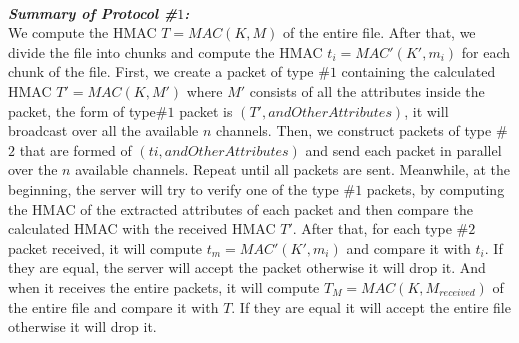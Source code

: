\documentclass[main.tex]{subfiles}
\begin{document}
\paragraph{}
\textbf{\textit{Summary of Protocol \#$1$:}}\\
We compute the HMAC $T = MAC(K,M)$ of the entire file. After that, we divide the file into chunks and compute the HMAC $t_i = MAC'(K',m_i)$ for each chunk of the file. First, we create a packet of type \#$1$ containing the calculated HMAC $T' = MAC(K,M')$ where $M'$ consists of all the attributes inside the packet, the form of type\#$1$ packet is $(T',andOtherAttributes)$, it will broadcast over all the available $n$ channels. Then, we construct packets of type \#$2$ that are formed of $(ti, andOtherAttributes)$ and send each packet in parallel over the $n$ available channels. Repeat until all packets are sent. Meanwhile, at the beginning, the server will try to verify one of the type \#$1$ packets, by computing the HMAC of the extracted attributes of each packet and then compare the calculated HMAC with the received HMAC $T'$. After that, for each type \#$2$ packet received, it will compute $t_m = MAC'(K',m_i)$ and compare it with $t_i$. If they are equal, the server will accept the packet otherwise it will drop it. And when it receives the entire packets, it will compute  $T_M = MAC(K,M_{received})$ of the entire file and compare it with $T$. If they are equal it will accept the entire file otherwise it will drop it.
\end{document}
